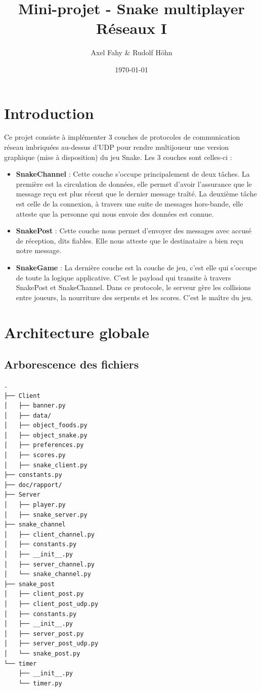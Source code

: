 \documentclass[a4paper]{article}
\title{Mini-projet - Snake multiplayer\\Réseaux I}
\author{Axel Fahy \& Rudolf Höhn}
\date{\today}
\begin{document}
\maketitle

\section{Introduction}
Ce projet consiste à implémenter 3 couches de protocoles de communication réseau imbriquées au-dessus d'UDP pour rendre multijoueur une version graphique (mise à disposition) du jeu Snake. Les 3 couches sont celles-ci :
\begin{itemize}
\item \textbf{SnakeChannel} : Cette couche s'occupe principalement de deux tâches. La première est la circulation de données, elle permet d'avoir l'assurance que le message reçu est plus récent que le dernier message traîté. La deuxième tâche est celle de la connexion, à travers une suite de messages hors-bande, elle atteste que la personne qui nous envoie des données est connue.
\item \textbf{SnakePost} : Cette couche nous permet d'envoyer des messages avec accusé de réception, dits fiables. Elle nous atteste que le destinataire a bien reçu notre message.
\item \textbf{SnakeGame} : La dernière couche est la couche de jeu, c'est elle qui s'occupe de toute la logique applicative. C'est le payload qui transite à travers SnakePost et SnakeChannel. Dans ce protocole, le serveur gère les collisions entre joueurs, la nourriture des serpents et les scores. C'est le maître du jeu.
\end{itemize}

\section{Architecture globale}
\subsection{Arborescence des fichiers}
\begin{verbatim}
.
├── Client
│   ├── banner.py
│   ├── data/
│   ├── object_foods.py
│   ├── object_snake.py
│   ├── preferences.py
│   ├── scores.py
│   ├── snake_client.py
├── constants.py
├── doc/rapport/
├── Server
│   ├── player.py
│   ├── snake_server.py
├── snake_channel
│   ├── client_channel.py
│   ├── constants.py
│   ├── __init__.py
│   ├── server_channel.py
│   └── snake_channel.py
├── snake_post
│   ├── client_post.py
│   ├── client_post_udp.py
│   ├── constants.py
│   ├── __init__.py
│   ├── server_post.py
│   ├── server_post_udp.py
│   └── snake_post.py
└── timer
    ├── __init__.py
    └── timer.py
\end{verbatim}
\end{document}
